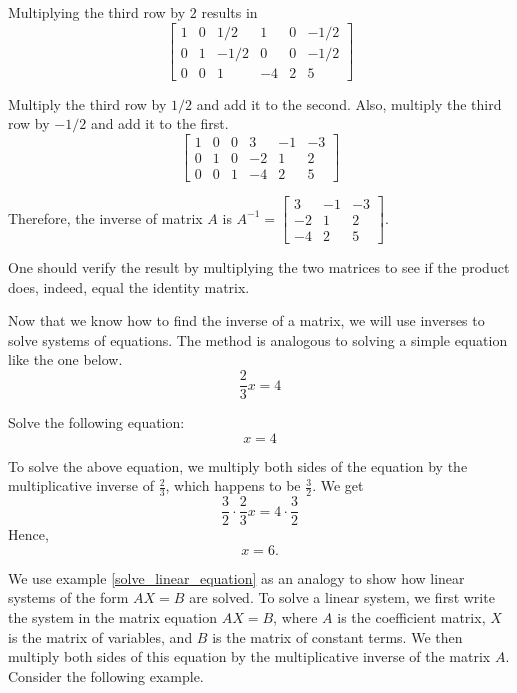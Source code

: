 \begin{solution}
    Multiplying the third row by \(2\) results in
    \[ \left[
            \begin{array}{ccc|ccc}
                1 & 0 & 1/2  & 1  & 0 & -1/2 \\
                0 & 1 & -1/2 & 0  & 0 & -1/2 \\
                0 & 0 & 1    & -4 & 2 & 5
            \end{array}
            \right] \]

    Multiply the third row by \(1/2\) and add it to the second. Also, multiply the third row by \(-1/2\) and add it to the first.
    \[ \left[
            \begin{array}{ccc|ccc}
                1 & 0 & 0 & 3  & -1 & -3 \\
                0 & 1 & 0 & -2 & 1  & 2  \\
                0 & 0 & 1 & -4 & 2  & 5
            \end{array}
            \right] \]

    Therefore, the inverse of matrix \( A \) is \( A^{-1} = \begin{bmatrix}
        3  & -1 & -3 \\
        -2 & 1  & 2  \\
        -4 & 2  & 5
    \end{bmatrix} \).

    One should verify the result by multiplying the two matrices to see if the product does, indeed, equal the identity matrix.
\end{solution}
Now that we know how to find the inverse of a matrix, we will use inverses to solve systems of equations.  The method is analogous to solving a simple equation like the one below.
$$\frac{2}{3}x = 4$$

\begin{example}\label{solve_linear_equation}
    Solve the following equation:
    \[ x = 4 \]
\end{example}

\begin{solution}
    To solve the above equation, we multiply both sides of the equation by the multiplicative inverse of \( \frac{2}{3} \), which happens to be \( \frac{3}{2} \). We get
    \[ \frac{3}{2} \cdot \frac{2}{3} x = 4 \cdot \frac{3}{2} \]
    Hence,
    \[ x = 6. \]
\end{solution}

We use example \ref{solve_linear_equation} as an analogy to show how linear systems of the form \( AX = B \) are solved.
To solve a linear system, we first write the system in the matrix equation \( AX = B \), where \( A \) is the coefficient matrix, \( X \) is the matrix of variables, and \( B \) is the matrix of constant terms.
We then multiply both sides of this equation by the multiplicative inverse of the matrix \( A \).
Consider the following example.

